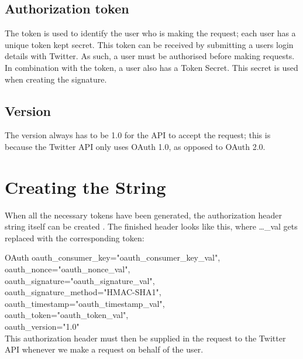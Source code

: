 \subsection*{Authorization token}
The token is used to identify the user who is making the request; each user has
a unique token kept secret. This token can be received by submitting a users
login details with Twitter. As such, a user must be authorised before making
requests. In combination with the token, a user also has a Token Secret. This
secret is used when creating the signature.


\subsection*{Version}
The version always has to be 1.0 for the API to accept the request; this is
because the Twitter \ac{API} only uses OAuth 1.0, as opposed to OAuth 2.0.

\section{Creating the String}\label{label:stringCreate}
When all the necessary tokens have been generated, the authorization header
string itself can be created \citep{TwitterAPIAuth}. The finished header looks like this, where
\ldots\_val gets replaced with the corresponding token:\nl

OAuth oauth\_consumer\_key="oauth\_consumer\_key\_val",\\
oauth\_nonce="oauth\_nonce\_val", \\
oauth\_signature="oauth\_signature\_val", \\
oauth\_signature\_method="HMAC-SHA1", \\
oauth\_timestamp="oauth\_timestamp\_val", \\
oauth\_token="oauth\_token\_val", \\
oauth\_version="1.0" \\

This authorization header must then be supplied in the request to the Twitter
API whenever we make a request on behalf of the user.
